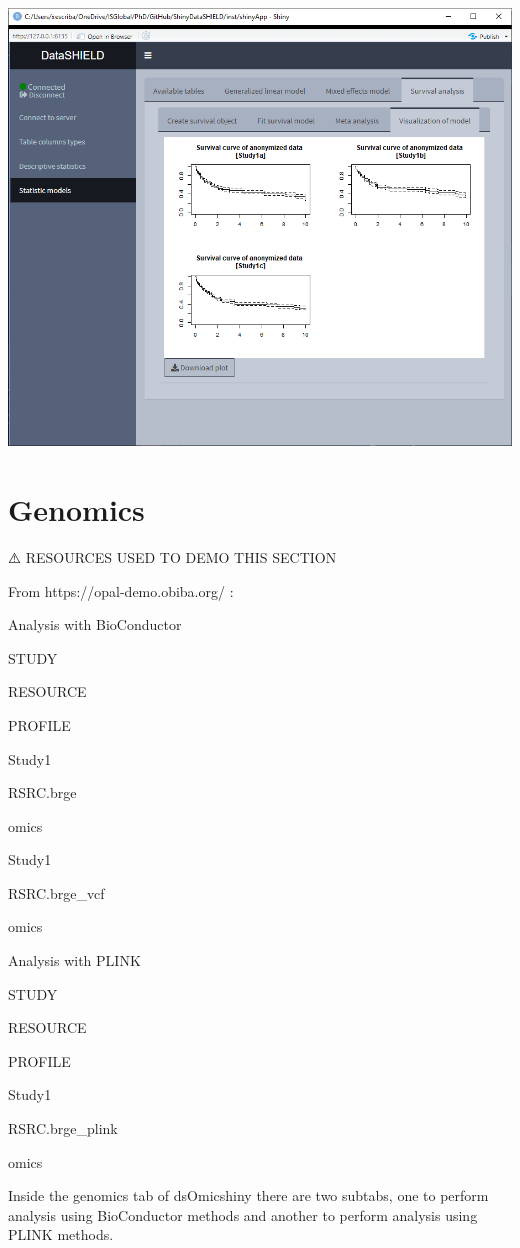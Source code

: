 \documentclass[
]{book}
\begin{document}
\includegraphics{images/survival6.png}

\hypertarget{genomics}{%
\section{Genomics}\label{genomics}}

⚠️ RESOURCES USED TO DEMO THIS SECTION

From https://opal-demo.obiba.org/ :

Analysis with BioConductor

STUDY

RESOURCE

PROFILE

Study1

RSRC.brge

omics

Study1

RSRC.brge\_vcf

omics

Analysis with PLINK

STUDY

RESOURCE

PROFILE

Study1

RSRC.brge\_plink

omics

Inside the genomics tab of dsOmicshiny there are two subtabs, one to perform analysis using BioConductor methods and another to perform analysis using PLINK methods.
\end{document}
